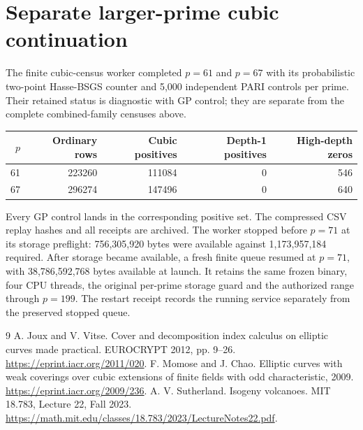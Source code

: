 \documentclass[11pt]{article}
\begin{document}
\section{Separate larger-prime cubic continuation}
The finite cubic-census worker completed $p=61$ and $p=67$ with its
probabilistic two-point Hasse-BSGS counter and 5,000 independent PARI controls
per prime. Their retained status is diagnostic with GP control; they are
separate from the complete combined-family censuses above.
\begin{center}\begin{tabular}{rrrrr}\toprule
$p$ & Ordinary rows & Cubic positives & Depth-1 positives & High-depth zeros\\\midrule
61 & 223260 & 111084 & 0 & 546\\
67 & 296274 & 147496 & 0 & 640\\\bottomrule
\end{tabular}\end{center}
Every GP control lands in the corresponding positive set. The compressed
CSV replay hashes and all receipts are archived. The worker stopped before
$p=71$ at its storage preflight: 756,305,920 bytes were available against
1,173,957,184 required. After storage became available, a fresh finite queue
resumed at $p=71$, with 38,786,592,768 bytes available at launch. It retains
the same frozen binary, four CPU threads, the original per-prime storage
guard and the authorized range through $p=199$. The restart receipt records
the running service separately from the preserved stopped queue.

\begin{thebibliography}{9}
 A. Joux and V. Vitse. Cover and decomposition index calculus on
elliptic curves made practical. EUROCRYPT 2012, pp. 9--26.
\url{https://eprint.iacr.org/2011/020}.
 F. Momose and J. Chao. Elliptic curves with weak coverings over
cubic extensions of finite fields with odd characteristic, 2009.
\url{https://eprint.iacr.org/2009/236}.
 A. V. Sutherland. Isogeny volcanoes. MIT 18.783,
Lecture 22, Fall 2023.
\url{https://math.mit.edu/classes/18.783/2023/LectureNotes22.pdf}.
\end{thebibliography}
\end{document}
